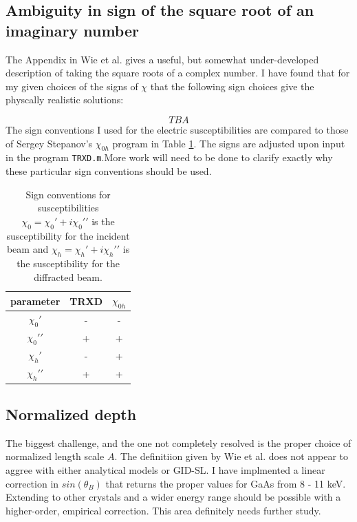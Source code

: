\documentclass[letterpaper,11pt]{article}
\begin{document}
\subsection{Ambiguity in sign of the square root of an imaginary number}
The Appendix in Wie et al. gives a useful, but somewhat under-developed description of taking the square roots of a complex number.  I have found that for my given choices of the signs of $\chi$ that the following sign choices give the physcally realistic solutions:

\begin{equation}
TBA
\end{equation}
The sign conventions I used for the electric susceptibilities are compared to those of Sergey Stepanov's $\chi_{0h}$ program in Table \ref{table:sign_conventions}.  The signs are adjusted upon input in the program \texttt{TRXD.m}.More work will need to be done to clarify exactly why these particular sign conventions should be used.  

\begin{table}
\begin{centering}
\begin{tabular}{c | c | c}
parameter  & TRXD & $\chi_{0h}$ \\
\hline
$\chi_{0}\prime$ & - & - \\
$\chi_{0}\prime\prime$ & + & + \\
$\chi_{h}\prime$ & - & + \\
$\chi_{h}\prime\prime$ & + & + \\
\end{tabular} 
\caption{Sign conventions for susceptibilities $\chi_{0}=\chi_{0}\prime+i\chi_{0}\prime\prime$ is the susceptibility for the incident beam and $\chi_{h}=\chi_{h}\prime+i\chi_{h}\prime\prime$ is the susceptibility for the diffracted beam.}
\label{table:sign_conventions}
\end{centering}
\end{table}

\subsection{Normalized depth}
The biggest challenge, and the one not completely resolved is the proper choice of normalized length scale $A$.  The definitiion given by Wie et al. does not appear to aggree with either analytical models or GID-SL.  I have implmented a linear correction in $sin(\theta_B)$ that returns the proper values for GaAs from 8 - 11 keV.  Extending to other crystals and a wider energy range should be possible with a higher-order, empirical correction.  This area definitely needs further study.  
\end{document}

